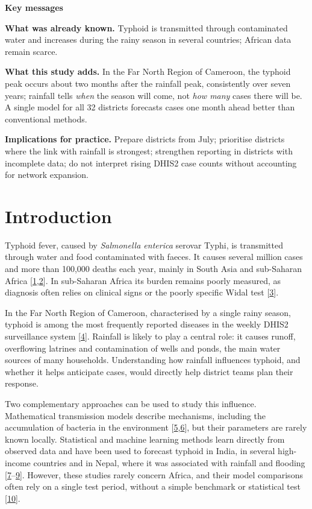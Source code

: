 \documentclass[11pt]{article}
\begin{document}
\begin{tcolorbox}[colback=white,colframe=black,boxrule=0.5pt,arc=0pt,left=8pt,right=8pt,top=5pt,bottom=5pt,fontupper=\small]
{\sffamily\bfseries\color{ora}Key messages}\par\vspace{2pt}
\textbf{What was already known.} Typhoid is transmitted through contaminated water and increases during the rainy season in several countries; African data remain scarce.\par
\textbf{What this study adds.} In the Far North Region of Cameroon, the typhoid peak occurs about two months after the rainfall peak, consistently over seven years; rainfall tells \textit{when} the season will come, not \textit{how many} cases there will be. A single model for all 32 districts forecasts cases one month ahead better than conventional methods.\par
\textbf{Implications for practice.} Prepare districts from July; prioritise districts where the link with rainfall is strongest; strengthen reporting in districts with incomplete data; do not interpret rising DHIS2 case counts without accounting for network expansion.
\end{tcolorbox}

\section{Introduction}
Typhoid fever, caused by \textit{Salmonella enterica} serovar Typhi, is transmitted through water and food contaminated with faeces. It causes several million cases and more than 100,000 deaths each year, mainly in South Asia and sub-Saharan Africa [\hyperlink{ref1}{1},\hyperlink{ref2}{2}]. In sub-Saharan Africa its burden remains poorly measured, as diagnosis often relies on clinical signs or the poorly specific Widal test [\hyperlink{ref3}{3}].

In the Far North Region of Cameroon, characterised by a single rainy season, typhoid is among the most frequently reported diseases in the weekly DHIS2 surveillance system [\hyperlink{ref4}{4}]. Rainfall is likely to play a central role: it causes runoff, overflowing latrines and contamination of wells and ponds, the main water sources of many households. Understanding how rainfall influences typhoid, and whether it helps anticipate cases, would directly help district teams plan their response.

Two complementary approaches can be used to study this influence. Mathematical transmission models describe mechanisms, including the accumulation of bacteria in the environment [\hyperlink{ref5}{5},\hyperlink{ref6}{6}], but their parameters are rarely known locally. Statistical and machine learning methods learn directly from observed data and have been used to forecast typhoid in India, in several high-income countries and in Nepal, where it was associated with rainfall and flooding [\hyperlink{ref7}{7}--\hyperlink{ref9}{9}]. However, these studies rarely concern Africa, and their model comparisons often rely on a single test period, without a simple benchmark or statistical test [\hyperlink{ref10}{10}].
\end{document}
